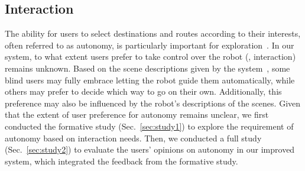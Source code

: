 \subsection{Interaction} %
The ability for users to select destinations and routes according to their interests, often referred to as autonomy, is particularly important for exploration~\cite{Kaniwa2024ChitChatGuide,kayukawa2022HowUsers}. 
In our system, to what extent users prefer to take control over the robot (\ie, interaction) remains unknown.
Based on the scene descriptions given by the system~\cite{Kaniwa2024ChitChatGuide}, some blind users may fully embrace letting the robot guide them automatically, while others may prefer to decide which way to go on their own.
Additionally, this preference may also be influenced by the robot's descriptions of the scenes. 
Given that the extent of user preference for autonomy remains unclear, we first conducted the formative study (Sec.~\ref{sec:study1}) to explore the requirement of autonomy based on interaction needs. 
Then, we conducted a full study (Sec.~\ref{sec:study2}) to evaluate the users' opinions on autonomy in our improved system, which integrated the feedback from the formative study.
